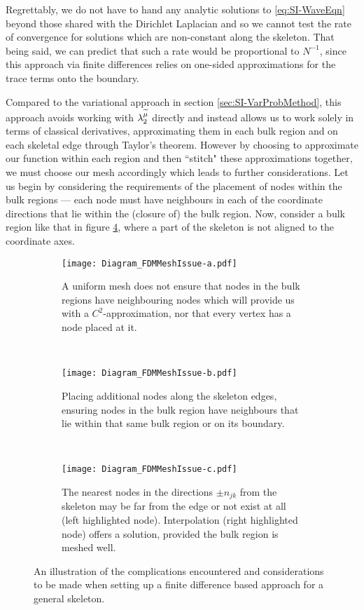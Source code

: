 Regrettably, we do not have to hand any analytic solutions to \eqref{eq:SI-WaveEqn} beyond those shared with the Dirichlet Laplacian and so we cannot test the rate of convergence for solutions which are non-constant along the skeleton.
That being said, we can predict that such a rate would be proportional to $N^{-1}$, since this approach via finite differences relies on one-sided approximations for the trace terms onto the boundary.

Compared to the variational approach in section \ref{sec:SI-VarProbMethod}, this approach avoids working with $\lambda_2^{\widetilde{\mu}}$ directly and instead allows us to work solely in terms of classical derivatives, approximating them in each bulk region and on each skeletal edge through Taylor's theorem.
However by choosing to approximate our function within each region and then ``stitch" these approximations together, we must choose our mesh accordingly which leads to further considerations.
Let us begin by considering the requirements of the placement of nodes within the bulk regions --- each node must have neighbours in each of the coordinate directions that lie within the (closure of) the bulk region.
Now, consider a bulk region like that in figure \ref{fig:Diagram_FDMMeshIssue}, where a part of the skeleton is not aligned to the coordinate axes.
\begin{figure}[b!]
	\centering
	\begin{subfigure}[t]{0.3\textwidth}
		\centering
		\texttt{[image: Diagram\_FDMMeshIssue-a.pdf]}
		\caption[]{\label{fig:Diagram_FDMMeshIssue-a} A uniform mesh does not ensure that nodes in the bulk regions have neighbouring nodes which will provide us with a $C^2$-approximation, nor that every vertex has a node placed at it.}
	\end{subfigure}
	~
	\begin{subfigure}[t]{0.3\textwidth}
		\centering
		\texttt{[image: Diagram\_FDMMeshIssue-b.pdf]}
		\caption[]{\label{fig:Diagram_FDMMeshIssue-b} Placing additional nodes along the skeleton edges, ensuring nodes in the bulk region have neighbours that lie within that same bulk region or on its boundary.}
	\end{subfigure}
	~
	\begin{subfigure}[t]{0.3\textwidth}
		\centering
		\texttt{[image: Diagram\_FDMMeshIssue-c.pdf]}
		\caption[]{\label{fig:Diagram_FDMMeshIssue-c} The nearest nodes in the directions $\pm n_{jk}$ from the skeleton may be far from the edge or not exist at all (left highlighted node). Interpolation (right highlighted node) offers a solution, provided the bulk region is meshed well.}
	\end{subfigure}
	\caption[Considerations for the placement of mesh nodes when handling arbitrary skeleton geometries.]{\label{fig:Diagram_FDMMeshIssue} An illustration of the complications encountered and considerations to be made when setting up a finite difference based approach for a general skeleton.}
\end{figure}
